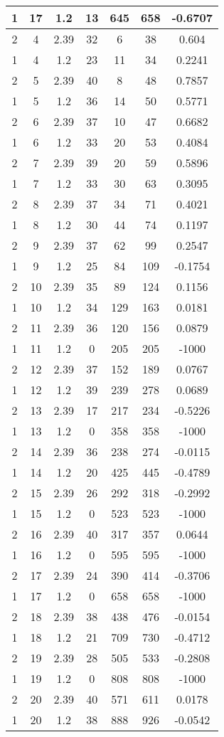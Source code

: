 \documentclass[letterpaper, 12pt]{article}
\begin{document}
\begin{longtable}{|c|c|c|c|c|c|c|}
\hline
1 & 17 & 1.2 & 13 & 645 & 658 & -0.6707 \\
\hline
2 & 4 & 2.39 & 32 & 6 & 38 & 0.604 \\
\hline
1 & 4 & 1.2 & 23 & 11 & 34 & 0.2241 \\
\hline
2 & 5 & 2.39 & 40 & 8 & 48 & 0.7857 \\
\hline
1 & 5 & 1.2 & 36 & 14 & 50 & 0.5771 \\
\hline
2 & 6 & 2.39 & 37 & 10 & 47 & 0.6682 \\
\hline
1 & 6 & 1.2 & 33 & 20 & 53 & 0.4084 \\
\hline
2 & 7 & 2.39 & 39 & 20 & 59 & 0.5896 \\
\hline
1 & 7 & 1.2 & 33 & 30 & 63 & 0.3095 \\
\hline
2 & 8 & 2.39 & 37 & 34 & 71 & 0.4021 \\
\hline
1 & 8 & 1.2 & 30 & 44 & 74 & 0.1197 \\
\hline
2 & 9 & 2.39 & 37 & 62 & 99 & 0.2547 \\
\hline
1 & 9 & 1.2 & 25 & 84 & 109 & -0.1754 \\
\hline
2 & 10 & 2.39 & 35 & 89 & 124 & 0.1156 \\
\hline
1 & 10 & 1.2 & 34 & 129 & 163 & 0.0181 \\
\hline
2 & 11 & 2.39 & 36 & 120 & 156 & 0.0879 \\
\hline
1 & 11 & 1.2 & 0 & 205 & 205 & -1000 \\
\hline
2 & 12 & 2.39 & 37 & 152 & 189 & 0.0767 \\
\hline
1 & 12 & 1.2 & 39 & 239 & 278 & 0.0689 \\
\hline
2 & 13 & 2.39 & 17 & 217 & 234 & -0.5226 \\
\hline
1 & 13 & 1.2 & 0 & 358 & 358 & -1000 \\
\hline
2 & 14 & 2.39 & 36 & 238 & 274 & -0.0115 \\
\hline
1 & 14 & 1.2 & 20 & 425 & 445 & -0.4789 \\
\hline
2 & 15 & 2.39 & 26 & 292 & 318 & -0.2992 \\
\hline
1 & 15 & 1.2 & 0 & 523 & 523 & -1000 \\
\hline
2 & 16 & 2.39 & 40 & 317 & 357 & 0.0644 \\
\hline
1 & 16 & 1.2 & 0 & 595 & 595 & -1000 \\
\hline
2 & 17 & 2.39 & 24 & 390 & 414 & -0.3706 \\
\hline
1 & 17 & 1.2 & 0 & 658 & 658 & -1000 \\
\hline
2 & 18 & 2.39 & 38 & 438 & 476 & -0.0154 \\
\hline
1 & 18 & 1.2 & 21 & 709 & 730 & -0.4712 \\
\hline
2 & 19 & 2.39 & 28 & 505 & 533 & -0.2808 \\
\hline
1 & 19 & 1.2 & 0 & 808 & 808 & -1000 \\
\hline
2 & 20 & 2.39 & 40 & 571 & 611 & 0.0178 \\
\hline
1 & 20 & 1.2 & 38 & 888 & 926 & -0.0542 \\
\hline
\end{longtable}
\end{document}
